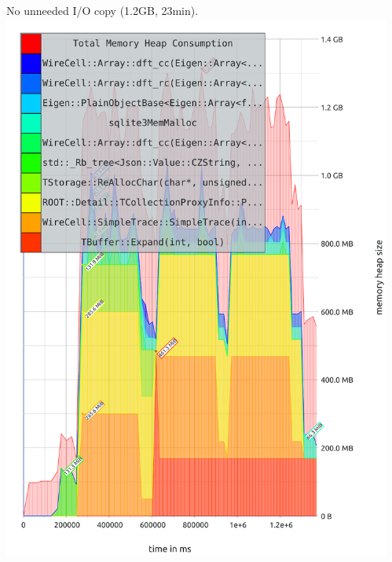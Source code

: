 \documentclass[xcolor=dvipsnames]{beamer}
\begin{document}
\begin{frame}
\begin{columns}
\begin{column}{0.4\textwidth}
\begin{center}
      \end{center}
    \end{column}

    \begin{column}{0.4\textwidth}
      \begin{center}
        \tiny No unneeded I/O copy (1.2GB, 23min).
        \includegraphics[height=0.8\textheight]{noshunt.pdf}
      \end{center}
    \end{column}
    
  \end{columns}

  \begin{center}
  \end{center}
\end{frame}
\end{document}
